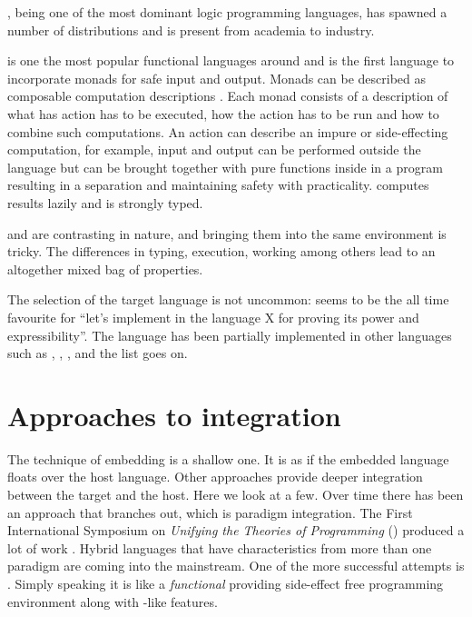\documentclass[thesis-solanki.tex]{subfiles}
\begin{document}
 \cite{wikiprolog}, being one of the most dominant logic programming languages, has spawned a
number of distributions and is present from academia to industry.

 is one the most popular \cite{website:langpop} functional languages around and is the first
language to incorporate monads \cite{wadler1992comprehending} for safe input and output.
Monads can be described as composable computation descriptions \cite{website:monadshaskellorg}.
Each monad consists of a description of what has action has to be executed, how the action has to be run and how to
combine such computations.
An action can describe an impure or side-effecting computation, for example, input and output can be performed
outside the language but can be brought together with pure functions inside in a program resulting in a separation
and maintaining safety with practicality.
 computes results lazily and is strongly typed.

 and  are contrasting in nature, and bringing them into the same environment is
tricky.
The differences in typing, execution, working among others lead to an altogether mixed bag of properties.


The selection of the target language is not uncommon:  seems to be the all time favourite for
``let's implement  in the language X for proving its power and expressibility''.
The  language has been partially implemented \cite{swipembedd} in other languages such as
 \cite{racklog}, 
\cite{komorowski1982qlog,robinson1982loglisp,robinson1980loglisp},  \cite{wikiprolog, jlog},
 \cite{jscriptlog} and the list \cite{yieldprolog} goes on.

\section{Approaches to integration}\label{background:approachestointegration}

The technique of embedding is a shallow one.
It is as if the embedded language floats over the host language.
Other approaches provide deeper integration between the target and the host.
Here we look at a few.
Over time there has been an approach that branches out, which is paradigm integration.
The First International Symposium on \textit{Unifying the Theories of Programming}
    \textup{(\cite{DBLP:conf/utp/2006})}
    produced a lot of work
    \textup{\cite{DBLP:conf/utp/2008,DBLP:conf/utp/2010,DBLP:conf/utp/2012,hoare1998unifying,
      gibbons2013unifying}}.
Hybrid languages that have characteristics from more than one paradigm are coming into the mainstream.
One of the more successful attempts is  \cite{website:scala}.
Simply speaking it is like a \textit{functional}  providing side-effect free programming environment
along with -like features.
\end{document}
